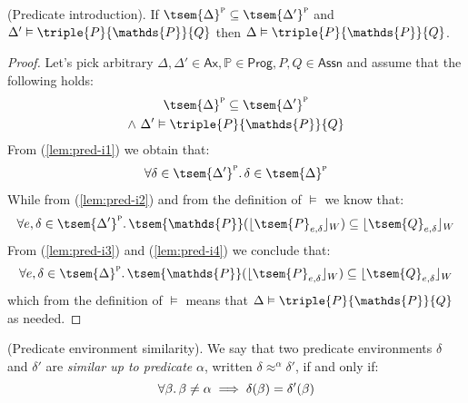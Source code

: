 \begin{lem}
	\label{lem:pred-i}
	(Predicate introduction).
	If $\tsem{\Delta}^\textsc{p} \subseteq \tsem{\Delta'}^\textsc{p}$ and $\Delta' \vDash \triple{P}{\mathds{P}}{Q}$ then $\Delta \vDash \triple{P}{\mathds{P}}{Q}$.
	\begin{proof}
		Let's pick arbitrary $\Delta, \Delta' \in \mathsf{Ax}, \mathds{P} \in \mathsf{Prog}, P, Q \in \mathsf{Assn}$ and assume that the following holds:
		\begin{gather}
			\label{lem:pred-i1} \tsem{\Delta}^\textsc{p} \subseteq \tsem{\Delta'}^\textsc{p} \\
			\label{lem:pred-i2} \land\ \Delta' \vDash \triple{P}{\mathds{P}}{Q}
		\end{gather}
		From (\ref{lem:pred-i1}) we obtain that:
		\begin{gather}
			\label{lem:pred-i3} \forall \delta \in \tsem{\Delta'}^\textsc{p} \ldotp \delta \in \tsem{\Delta}^\textsc{p}
		\end{gather}
		While from (\ref{lem:pred-i2}) and from the definition of $\vDash$ we know that:
		\begin{gather}
			\label{lem:pred-i4} \forall e, \delta \in \tsem{\Delta'}^\textsc{p} \ldotp \tsem{\mathds{P}}(\lfloor \tsem{P}_{e, \delta} \rfloor_W) \subseteq \lfloor \tsem{Q}_{e, \delta} \rfloor_W
		\end{gather}
		From (\ref{lem:pred-i3}) and (\ref{lem:pred-i4}) we conclude that:
		\[
			\forall e, \delta \in \tsem{\Delta}^\textsc{p} \ldotp \tsem{\mathds{P}}(\lfloor \tsem{P}_{e, \delta} \rfloor_W) \subseteq \lfloor \tsem{Q}_{e, \delta} \rfloor_W
		\]
		which from the definition of $\vDash$ means that $\Delta \vDash \triple{P}{\mathds{P}}{Q}$ as needed.
	\end{proof}
\end{lem}

\begin{defn}
	(Predicate environment similarity).
	We say that two predicate environments $\delta$ and $\delta'$ are \emph{similar up to predicate} $\alpha$, written $\delta \approx^\alpha \delta'$, if and only if:
	\[
		\forall \beta \ldotp \beta \neq \alpha \implies \delta(\beta) = \delta'(\beta)
	\]
\end{defn}

